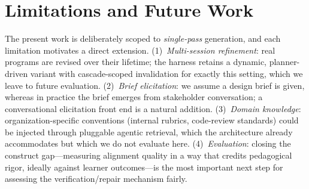 \section{Limitations and Future Work}
\label{sec:future-work}

The present work is deliberately scoped to \emph{single-pass} generation, and each
limitation motivates a direct extension. (1)~\emph{Multi-session refinement}: real
programs are revised over their lifetime; the harness retains a dynamic,
planner-driven variant with cascade-scoped invalidation for exactly this setting,
which we leave to future evaluation. (2)~\emph{Brief elicitation}: we assume a
design brief is given, whereas in practice the brief emerges from stakeholder
conversation; a conversational elicitation front end is a natural addition.
(3)~\emph{Domain knowledge}: organization-specific conventions (internal rubrics,
code-review standards) could be injected through pluggable agentic retrieval, which
the architecture already accommodates but which we do not evaluate here.
(4)~\emph{Evaluation}: closing the construct gap---measuring alignment quality in a
way that credits pedagogical rigor, ideally against learner outcomes---is the most
important next step for assessing the verification/repair mechanism fairly.
